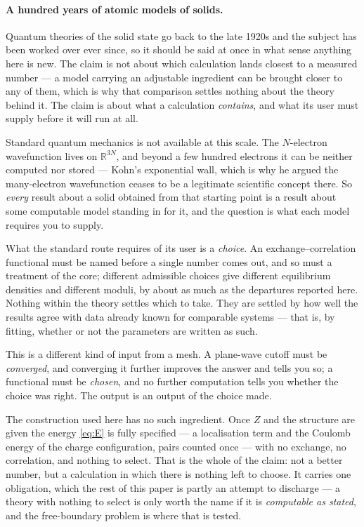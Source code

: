 \documentclass[11pt]{article}
\begin{document}
\paragraph{A hundred years of atomic models of solids.} Quantum theories of the solid state go back
to the late 1920s and the subject has been worked over ever since, so it should be said at once in
what sense anything here is new. The claim is not
about which calculation lands closest to a measured number --- a model carrying an adjustable
ingredient can be brought closer to any of them, which is why that comparison settles nothing about
the theory behind it. The claim is about what a calculation \emph{contains}, and what its user must
supply before it will run at all.

Standard quantum mechanics is not available at this scale. The $N$-electron wavefunction lives on
$\mathbb{R}^{3N}$, and beyond a few hundred electrons it can be neither computed nor stored ---
Kohn's exponential wall, which is why he argued the many-electron wavefunction ceases to be a
legitimate scientific concept there. So \emph{every} result about a solid obtained from that
starting point is a result about some computable model standing in for it, and the question is what
each model requires you to supply.

What the standard route requires of its user is a \emph{choice}. An exchange--correlation functional
must be named before a single number comes out, and so must a treatment of the core; different
admissible choices give different equilibrium densities and different moduli, by about as much as
the departures reported here. Nothing within the theory settles which to take. They are settled by
how well the results agree with data already known for comparable systems --- that is, by fitting,
whether or not the parameters are written as such.

This is a different kind of input from a mesh. A plane-wave cutoff must be \emph{converged}, and
converging it further improves the answer and tells you so; a functional must be \emph{chosen}, and
no further computation tells you whether the choice was right. The output is an output of the choice
made.

The construction used here has no such ingredient. Once $Z$ and the structure are given the energy
\eqref{eq:E} is fully specified --- a localisation term and the Coulomb energy of the charge
configuration, pairs counted once --- with no exchange, no correlation, and nothing to select. That
is the whole of the claim: not a better number, but a calculation in which there is nothing left to
choose. It carries one obligation, which the rest of this paper is
partly an attempt to discharge --- a theory with nothing to select is only worth the name if it is
\emph{computable as stated}, and the free-boundary problem is where that is tested.
\end{document}
